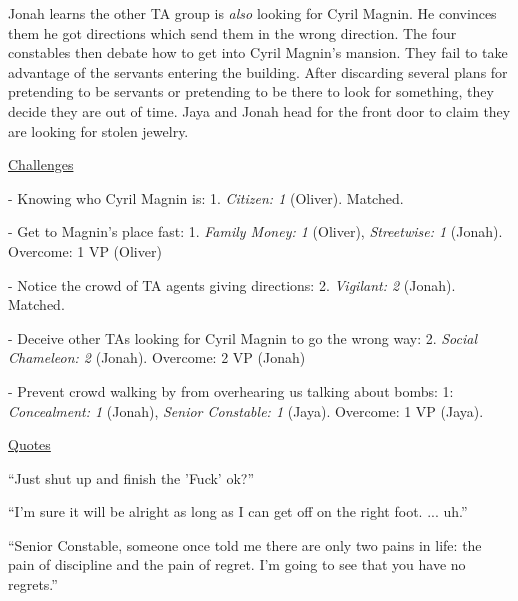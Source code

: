 Jonah learns the other TA group is \textit{also} looking for Cyril Magnin.  He convinces them he got directions which send them in the wrong direction.  The four constables then debate how to get into Cyril Magnin's mansion.  They fail to take advantage of the servants entering the building.  After discarding several plans for pretending to be servants or pretending to be there to look for something, they decide they are out of time.  Jaya and Jonah head for the front door to claim they are looking for stolen jewelry.



\underline{  {\LARGE Challenges }  }



- Knowing who Cyril Magnin is: 1.  \textit{Citizen: 1} (Oliver).  Matched.

- Get to Magnin's place fast: 1.  \textit{Family Money: 1} (Oliver), \textit{Streetwise: 1} (Jonah). Overcome: 1 VP (Oliver)

- Notice the crowd of TA agents giving directions: 2.  \textit{Vigilant: 2} (Jonah).  Matched.

- Deceive other TAs looking for Cyril Magnin to go the wrong way: 2.  \textit{Social Chameleon: 2} (Jonah). Overcome: 2 VP (Jonah)

- Prevent crowd walking by from overhearing us talking about bombs: 1: \textit{Concealment: 1} (Jonah), \textit{Senior Constable: 1} (Jaya).  Overcome: 1 VP (Jaya).



\underline{  {\LARGE Quotes }  }



``Just shut up and finish the 'Fuck' ok?''




``I'm sure it will be alright as long as I can get off on the right foot. ... uh.'' 





``Senior Constable, someone once told me there are only two pains in life: the pain of discipline and the pain of regret.  I'm going to see that you have no regrets.''

